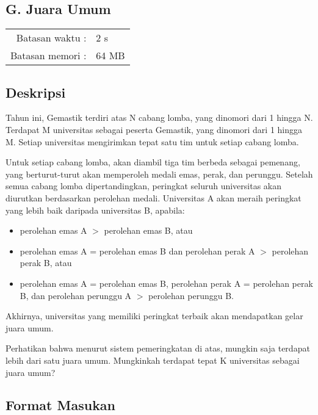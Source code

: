 \documentclass[../main_problemset.tex]{subfiles} %
\newcommand{\problemName}{G. Juara Umum}
\newcommand{\problemTL}{2 s}
\newcommand{\problemML}{64 MB}
\begin{document}
\begin{center}
    \section*{\problemName}
    \addcontentsline{toc}{section}{\problemName} %
    
    \begin{tabular}{rl}
    Batasan waktu : & \problemTL \\
    Batasan memori : & \problemML
    \end{tabular}
\end{center}

\subsection*{Deskripsi}

Tahun ini, Gemastik terdiri atas N cabang lomba, yang dinomori dari 1 hingga N. Terdapat M universitas sebagai peserta Gemastik, yang dinomori dari 1 hingga M. Setiap universitas mengirimkan tepat satu tim untuk setiap cabang lomba.

Untuk setiap cabang lomba, akan diambil tiga tim berbeda sebagai pemenang, yang berturut-turut akan memperoleh medali emas, perak, dan perunggu. Setelah semua cabang lomba dipertandingkan, peringkat seluruh universitas akan diurutkan berdasarkan perolehan medali. Universitas A akan meraih peringkat yang lebih baik daripada universitas B, apabila:

\begin{itemize}
	\item perolehan emas A $ > $ perolehan emas B, atau
	\item perolehan emas A = perolehan emas B dan perolehan perak A $ > $ perolehan perak B, atau
	\item perolehan emas A = perolehan emas B, perolehan perak A = perolehan perak B, dan perolehan perunggu A $ > $ perolehan perunggu B.
\end{itemize}

Akhirnya, universitas yang memiliki peringkat terbaik akan mendapatkan gelar juara umum.

Perhatikan bahwa menurut sistem pemeringkatan di atas, mungkin saja terdapat lebih dari satu juara umum. Mungkinkah terdapat tepat K universitas sebagai juara umum?

\subsection*{Format Masukan}
\end{document}
